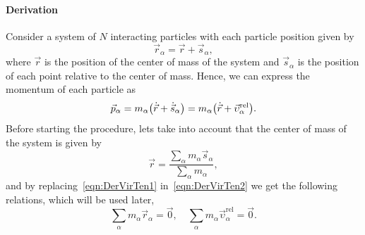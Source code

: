 \paragraph{Derivation} Consider a system of $N$ interacting particles with each particle position given by
\begin{equation}
    \vec{r}_{\alpha} = \vec{r} + \vec{s}_{\alpha}\label{eqn:DerVirTen1},
\end{equation}
where $\vec{r}$ is the position of the center of mass of the system and $\vec{s}_\alpha$ is the position of each point relative to the center of mass.
Hence, we can express the momentum of each particle as
\begin{equation}
    \vec{p}_\alpha = m_\alpha\qty(\dot{\vec{r}}+\dot{\vec{s}}_\alpha) = m_\alpha\qty(\dot{\vec{r}}+\vec{\upsilon}_\alpha^{\mathrm{rel}}).\label{eqn:DerVirTen2}
\end{equation}
Before starting the procedure, lets take into account that the center of mass of the system is given by
\begin{equation}
    \vec{r} = \frac{\sum_{\alpha}m_\alpha\vec{s}_\alpha}{\sum_{\alpha}m_\alpha}\label{eqn:DerVirTen3},
\end{equation}
and by replacing~\eqref{eqn:DerVirTen1} in~\eqref{eqn:DerVirTen2} we get the following relations, which will be used later,
\begin{equation}
    \sum_\alpha m_\alpha\vec{r}_\alpha = \vec{0},\quad
    \sum_\alpha m_\alpha\vec{\upsilon}_\alpha^{\mathrm{rel}} = \vec{0}.\label{eqn:DerVirTen4}
\end{equation}

